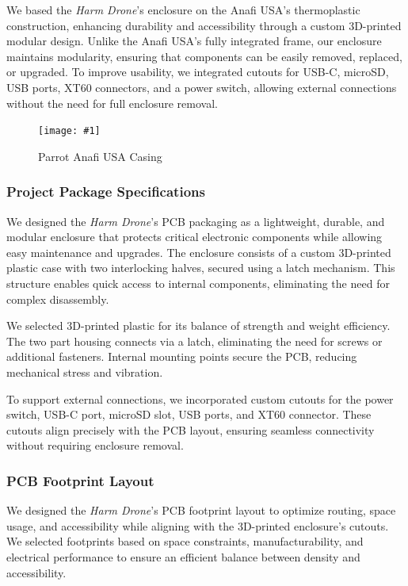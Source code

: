 \documentclass[12pt]{article}
\newcommand{\quickfigure}[4]{%
\begin{figure}[!htbp]
\centering
\texttt{[image: \#1]}
\caption{#3}
\label{#4}
\end{figure}%
}
\begin{document}
\par We based the \textit{Harm Drone}’s enclosure on the Anafi USA’s thermoplastic construction, enhancing durability and accessibility through a custom 3D-printed modular design. Unlike the Anafi USA’s fully integrated frame, our enclosure maintains modularity, ensuring that components can be easily removed, replaced, or upgraded. To improve usability, we integrated cutouts for USB-C, microSD, USB ports, XT60 connectors, and a power switch, allowing external connections without the need for full enclosure removal.

\quickfigure{images/parrot-anafi-USA-casing.jpg}{15cm}{Parrot Anafi USA Casing}{parrot-anafi-usa-casing}

\subsubsection{Project Package Specifications}

\par We designed the \textit{Harm Drone}’s PCB packaging as a lightweight, durable, and modular enclosure that protects critical electronic components while allowing easy maintenance and upgrades. The enclosure consists of a custom 3D-printed plastic case with two interlocking halves, secured using a latch mechanism. This structure enables quick access to internal components, eliminating the need for complex disassembly.

\par We selected 3D-printed plastic for its balance of strength and weight efficiency. The two part housing connects via a latch, eliminating the need for screws or additional fasteners. Internal mounting points secure the PCB, reducing mechanical stress and vibration.

\par To support external connections, we incorporated custom cutouts for the power switch, USB-C port, microSD slot, USB ports, and XT60 connector. These cutouts align precisely with the PCB layout, ensuring seamless connectivity without requiring enclosure removal.

\subsubsection{PCB Footprint Layout}

\par We designed the \textit{Harm Drone}’s PCB footprint layout to optimize routing, space usage, and accessibility while aligning with the 3D-printed enclosure’s cutouts. We selected footprints based on space constraints, manufacturability, and electrical performance to ensure an efficient balance between density and accessibility.
\end{document}
